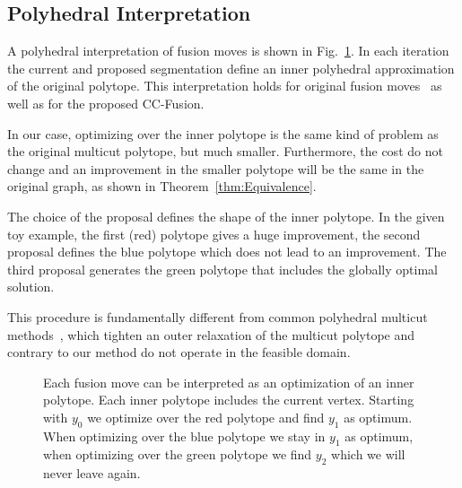 \documentclass[10pt,twocolumn,letterpaper]{article}
\newtheorem{theorem}{Theorem}
\theoremstyle{definition}
\begin{document}

%






\subsection{Polyhedral Interpretation}
A polyhedral interpretation of fusion moves is shown in Fig.~\ref{fig:polyheadral}.
In each iteration the current and proposed segmentation define an inner polyhedral 
approximation of the original polytope. This interpretation holds for original 
fusion moves~\cite{Lempitsky-2010} as well as for the proposed CC-Fusion.

In our case, optimizing over the inner polytope is the same kind of problem as the original multicut polytope, but much smaller.
Furthermore, the cost do not change and an improvement in the smaller polytope will 
be the same in the original graph, as shown in Theorem~\ref{thm:Equivalence}.

The choice of the proposal defines the shape of the inner polytope. 
In the given toy example, the first (red) polytope gives a huge improvement, the second proposal
defines the blue polytope which does not lead to an improvement. 
The third proposal generates the green polytope that includes the globally optimal solution.

This procedure is fundamentally different from common polyhedral multicut methods~\cite{kappes_2011_emmcvpr,kappes_2013_arxiv}, 
which tighten an outer relaxation of the multicut polytope and contrary to our method do not operate in the feasible domain. 



\begin{figure}
\centering

\caption{Each fusion move can be interpreted as an optimization of an inner polytope.
Each inner polytope includes the current vertex. Starting with $y_0$ we optimize over the red polytope 
and find $y_1$ as optimum. When optimizing over the blue polytope we stay in $y_1$ as optimum,
when optimizing over the green polytope we find $y_2$ which we will never leave again. 
}
\label{fig:polyheadral}
\end{figure}





\end{document}
